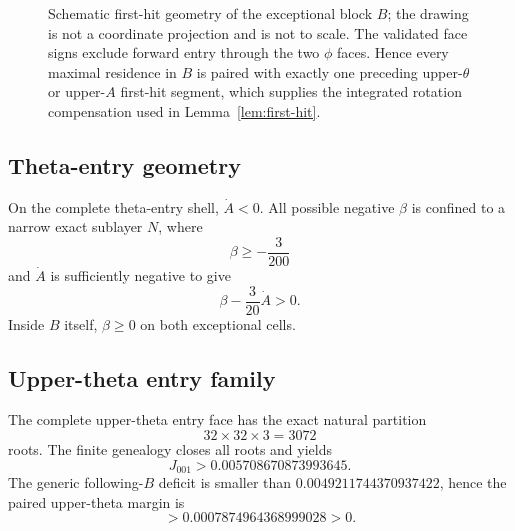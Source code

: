\documentclass[11pt]{article}
\begin{document}
\begin{figure}[ht]
\centering
{}
\caption{Schematic first-hit geometry of the exceptional block $B$; the drawing is not a coordinate projection and is not to scale. The validated face signs exclude forward entry through the two $\phi$ faces. Hence every maximal residence in $B$ is paired with exactly one preceding upper-$\theta$ or upper-$A$ first-hit segment, which supplies the integrated rotation compensation used in Lemma~\ref{lem:first-hit}.}
\label{fig:first-hit}
\end{figure}


\subsection{Theta-entry geometry}
On the complete theta-entry shell, $\dot A<0$. All possible negative $\beta$ is confined to a narrow exact sublayer $N$, where
\[
\beta\ge-\frac{3}{200}
\]
and $\dot A$ is sufficiently negative to give
\[
\beta-\frac{3}{20}\dot A>0.
\]
Inside $B$ itself, $\beta\ge0$ on both exceptional cells.

\subsection{Upper-theta entry family}
The complete upper-theta entry face has the exact natural partition
\[
32\times32\times3=3072
\]
roots. The finite genealogy closes all roots and yields
\[
J_{001}>0.005708670873993645.
\]
The generic following-$B$ deficit is smaller than $0.0049211744370937422$, hence the paired upper-theta margin is
\[
>0.0007874964368999028>0.
\]
\end{document}
